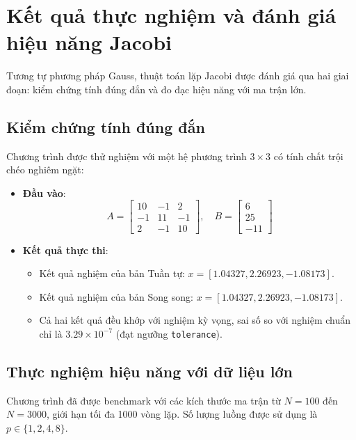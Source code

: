 \section{Kết quả thực nghiệm và đánh giá hiệu năng Jacobi}

Tương tự phương pháp Gauss, thuật toán lặp Jacobi được đánh giá qua hai giai đoạn: kiểm chứng tính đúng đắn và đo đạc hiệu năng với ma trận lớn.

\subsection{Kiểm chứng tính đúng đắn}
Chương trình được thử nghiệm với một hệ phương trình $3 \times 3$ có tính chất trội chéo nghiêm ngặt:
\begin{itemize}
  \item \textbf{Đầu vào}:
        \[
          A = \begin{bmatrix}
            10 & -1 & 2 \\
            -1 & 11 & -1 \\
            2 & -1 & 10
          \end{bmatrix}, \quad
          B = \begin{bmatrix}
            6 \\ 25 \\ -11
          \end{bmatrix}
        \]
  \item \textbf{Kết quả thực thi}:
        \begin{itemize}
          \item Kết quả nghiệm của bản Tuần tự: $x = [1.04327, 2.26923, -1.08173]$.
          \item Kết quả nghiệm của bản Song song: $x = [1.04327, 2.26923, -1.08173]$.
          \item Cả hai kết quả đều khớp với nghiệm kỳ vọng, sai số so với nghiệm chuẩn chỉ là $3.29 \times 10^{-7}$ (đạt ngưỡng \texttt{tolerance}).
        \end{itemize}
\end{itemize}

\subsection{Thực nghiệm hiệu năng với dữ liệu lớn}
Chương trình đã được benchmark với các kích thước ma trận từ $N=100$ đến $N=3000$, giới hạn tối đa 1000 vòng lặp. Số lượng luồng được sử dụng là $p \in \{1, 2, 4, 8\}$. 

